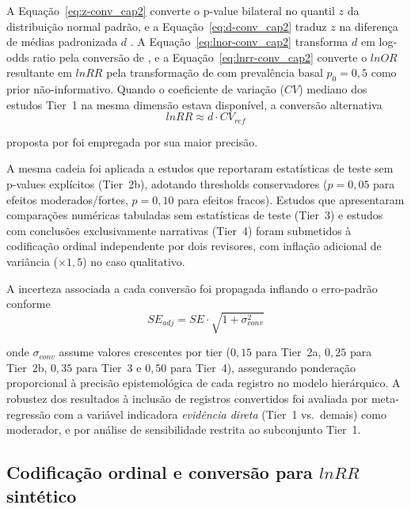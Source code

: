 \noindent A Equação~\ref{eq:z-conv_cap2} converte o p-value bilateral no quantil $z$ da distribuição normal padrão, e a Equação~\ref{eq:d-conv_cap2} traduz $z$ na diferença de médias padronizada $d$ \cite{Borenstein2009}. A Equação~\ref{eq:lnor-conv_cap2} transforma $d$ em log-odds ratio pela conversão de , e a Equação~\ref{eq:lnrr-conv_cap2} converte o $lnOR$ resultante em $lnRR$ pela transformação de  com prevalência basal $p_0 = 0{,}5$ como prior não-informativo. Quando o coeficiente de variação ($CV$) mediano dos estudos Tier~1 na mesma dimensão estava disponível, a conversão alternativa
%
\begin{equation}
lnRR \approx d \cdot CV_{ref}
\label{eq:lnrr-cv_cap2}
\end{equation}

\noindent proposta por  foi empregada por sua maior precisão.

A mesma cadeia foi aplicada a estudos que reportaram estatísticas de teste sem p-values explícitos (Tier~2b), adotando thresholds conservadores ($p = 0{,}05$ para efeitos moderados/fortes, $p = 0{,}10$ para efeitos fracos). Estudos que apresentaram comparações numéricas tabuladas sem estatísticas de teste (Tier~3) e estudos com conclusões exclusivamente narrativas (Tier~4) foram submetidos à codificação ordinal independente por dois revisores, com inflação adicional de variância ($\times 1{,}5$) no caso qualitativo.

A incerteza associada a cada conversão foi propagada inflando o erro-padrão conforme
%
\begin{equation}
SE_{adj} = SE \cdot \sqrt{1 + \sigma^2_{conv}}
\label{eq:se-adj_cap2}
\end{equation}

\noindent onde $\sigma_{conv}$ assume valores crescentes por tier ($0{,}15$ para Tier~2a, $0{,}25$ para Tier~2b, $0{,}35$ para Tier~3 e $0{,}50$ para Tier~4), assegurando ponderação proporcional à precisão epistemológica de cada registro no modelo hierárquico. A robustez dos resultados à inclusão de registros convertidos foi avaliada por meta-regressão com a variável indicadora \textit{evidência direta} (Tier~1 vs.~demais) como moderador, e por análise de sensibilidade restrita ao subconjunto Tier~1.

\subsection{Codificação ordinal e conversão para $lnRR$ sintético}
\label{sec:coding_cap2}

